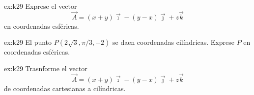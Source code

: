 \begin{multicols}{2}
     \begin{excercise}[][][$\vec{A}=R\vec{e}_R-R\sin{\phi}\vec{e}_\theta$]{ex:k29}{ 
             Exprese el vector 
             \begin{equation*}
                 \vec{A}=(x+y)\vec{\imath}-(y-x)\vec{\jmath} +z\vec{k}
             \end{equation*}
             en coordenadas esféricas.
         }
     \end{excercise}

     \begin{excercise}[][][$P=P(4, 2\pi/3, \pi/3)$]{ex:k29}{ 
             El punto $P(2\sqrt{3},\pi/3, -2)$ se daen coordenadas cilíndricas. Exprese $P$ en coordenadas esféricas.        
         }
     \end{excercise}

     \begin{excercise}[][][$\vec{A}=R\vec{e}_R-R\sin{\phi}\vec{e}_\theta$]{ex:k29}{ 
             Trasnforme el vector 
             \begin{equation*}
                 \vec{A}=(x+y)\vec{\imath}-(y-x)\vec{\jmath} +z\vec{k}
             \end{equation*}
             de coordenadas cartesianas a cilíndricas.
         }
     \end{excercise}
\end{multicols}
